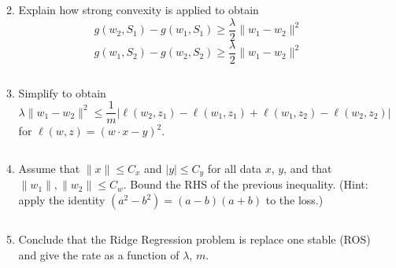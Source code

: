 \documentclass[
10pt, %
a4paper, %
oneside, %
headinclude,footinclude, %
BCOR5mm, %
]{scrartcl}
\begin{document}
\begin{enumerate}
\begin{enumerate}
        \[\] %

        \item Explain how strong convexity is applied to obtain
        \[
        g(w_2, S_1) - g(w_1, S_1) \geq \frac{\lambda}{2} \|w_1 - w_2\|^2
        \]
        \[
        g(w_1, S_2) - g(w_2, S_2) \geq \frac{\lambda}{2} \|w_1 - w_2\|^2
        \]

        \[\] %

        \item Simplify to obtain
        \[
        \lambda \|w_1 - w_2\|^2 \leq \frac{1}{m} | \ell(w_2, z_1) - \ell(w_1, z_1) + \ell(w_1, z_2) - \ell(w_2, z_2) |
        \]
        for $\ell(w, z) = (w \cdot x - y)^2$.

        \[\] %

        \item Assume that $\|x\| \leq C_x$ and $|y| \leq C_y$ for all data $x$, $y$, and that $\|w_1\|, \|w_2\| \leq C_w$. Bound the RHS of the previous inequality. (Hint: apply the identity $(a^2 - b^2) = (a - b)(a + b)$ to the loss.)

        \[\] %

        \item Conclude that the Ridge Regression problem is replace one stable (ROS) and give the rate as a function of $\lambda$, $m$.

        \[\] %
    \end{enumerate}

    \[\] %
\end{enumerate}


\end{document}
